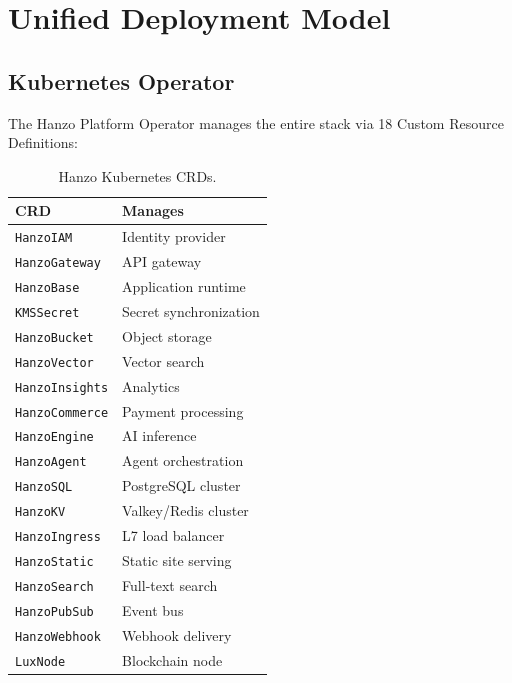 \section{Unified Deployment Model}

\label{sec:deployment}

\subsection{Kubernetes Operator}

The Hanzo Platform Operator manages the entire stack via 18 Custom Resource Definitions:

\begin{table}[H]
\centering
\caption{Hanzo Kubernetes CRDs.}
\footnotesize
\begin{tabular}{@{}ll@{}}
\toprule
CRD & Manages \\
\midrule
\texttt{HanzoIAM} & Identity provider \\
\texttt{HanzoGateway} & API gateway \\
\texttt{HanzoBase} & Application runtime \\
\texttt{KMSSecret} & Secret synchronization \\
\texttt{HanzoBucket} & Object storage \\
\texttt{HanzoVector} & Vector search \\
\texttt{HanzoInsights} & Analytics \\
\texttt{HanzoCommerce} & Payment processing \\
\texttt{HanzoEngine} & AI inference \\
\texttt{HanzoAgent} & Agent orchestration \\
\texttt{HanzoSQL} & PostgreSQL cluster \\
\texttt{HanzoKV} & Valkey/Redis cluster \\
\texttt{HanzoIngress} & L7 load balancer \\
\texttt{HanzoStatic} & Static site serving \\
\texttt{HanzoSearch} & Full-text search \\
\texttt{HanzoPubSub} & Event bus \\
\texttt{HanzoWebhook} & Webhook delivery \\
\texttt{LuxNode} & Blockchain node \\
\bottomrule
\end{tabular}
\end{table}

